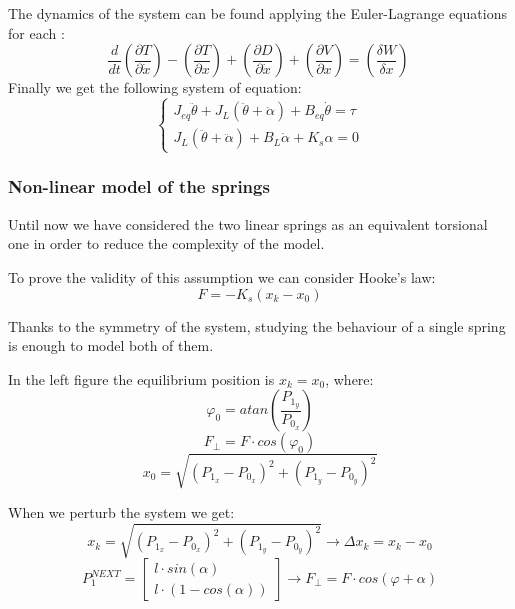             The dynamics of the system can be found applying the Euler-Lagrange equations for each \dof:
            \begin{equation*}
                \frac{d}{dt} \left(\frac{\partial T}{\partial \dot{x}}\right)-\left(\frac{\partial T}{\partial x}\right)+\left(\frac{\partial D}{\partial \dot{x}}\right)+\left(\frac{\partial V}{\partial x}\right) = \left(\frac{\delta W}{\delta x}\right)\
            \end{equation*}
            Finally we get the following system of equation:
            \begin{equation*}
                \begin{cases*}
                    J_{eq}\ddot\theta+J_{L}(\ddot\theta+\ddot\alpha) + B_{eq}\dot\theta=\tau \\
                    J_{L}(\ddot\theta+\ddot\alpha)+B_L\dot\alpha +K_s\alpha=0
                \end{cases*}
            \end{equation*}

            \subsubsection{Non-linear model of the springs}

                Until now we have considered the two linear springs as an equivalent torsional one in order to reduce the complexity of the model.

                To prove the validity of this assumption we can consider Hooke's law:
                    \[
                        F = - K_s (x_k - x_0)
                    \]

                Thanks to the symmetry of the system, studying the behaviour of a single spring is enough to model both of them.


                In the left figure the equilibrium position is $x_k = x_0$, where:
                \[
                    \varphi_0 = atan\left(\frac{P_{1_y}}{P_{0_x}}\right)\]
                \[
                    F_\perp = F \cdot cos(\varphi_0)\]
                \[
                    x_0 = \sqrt{(P_{1_x} - P_{0_x})^2+(P_{1_y} - P_{0_y})^2}\]

                When we perturb the system we get:
                \[
                    x_k = \sqrt{(P_{1_x} - P_{0_x})^2+(P_{1_y} - P_{0_y})^2} \rightarrow \Delta x_k = x_k - x_0\]
                \[
                    P_1^{NEXT} = \left\lbrack \begin{array}{c}
                        l \cdot sin(\alpha) \\
                        l \cdot (1-cos(\alpha))
                        \end{array}\right\rbrack
                        \rightarrow F_\perp  = F \cdot cos(\varphi + \alpha)\]



